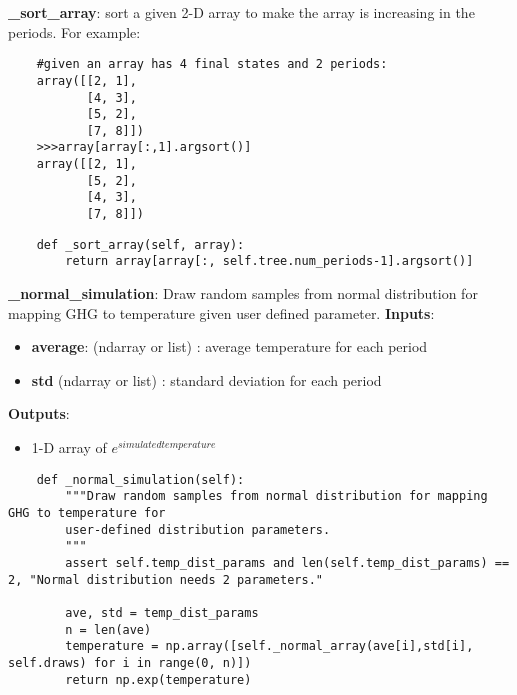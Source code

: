 \documentclass[12pt]{article}
\begin{document}
\textbf{\_sort\_array}: sort a given 2-D array to make the array is increasing in the periods. For example:
\begin{verbatim}
    #given an array has 4 final states and 2 periods:
    array([[2, 1],
           [4, 3],
           [5, 2],
           [7, 8]])
    >>>array[array[:,1].argsort()]
    array([[2, 1],
           [5, 2],
           [4, 3],
           [7, 8]])
\end{verbatim}
\begin{verbatim}
    def _sort_array(self, array):
        return array[array[:, self.tree.num_periods-1].argsort()]
\end{verbatim}

\textbf{ \_normal\_simulation}: Draw random samples from normal distribution for mapping GHG to temperature given user defined parameter.
\textbf{Inputs}:
\begin{itemize}
  \item \textbf{average}: (ndarray or list) : average temperature for each period
  \item \textbf{std} (ndarray or list) : standard deviation for each period
\end{itemize}
\textbf{Outputs}:
\begin{itemize}
  \item 1-D array of $e^{simulated temperature}$
\end{itemize}
\begin{verbatim}
    def _normal_simulation(self):
        """Draw random samples from normal distribution for mapping GHG to temperature for
        user-defined distribution parameters.
        """
        assert self.temp_dist_params and len(self.temp_dist_params) == 2, "Normal distribution needs 2 parameters."

        ave, std = temp_dist_params
        n = len(ave)
        temperature = np.array([self._normal_array(ave[i],std[i], self.draws) for i in range(0, n)])
        return np.exp(temperature)
\end{verbatim}
\end{document}
